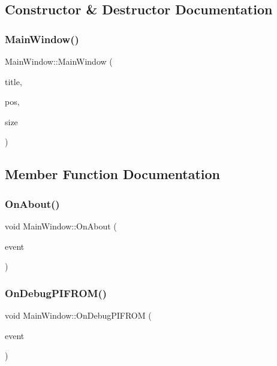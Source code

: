 \subsection{Constructor \& Destructor Documentation}
\mbox{\label{class_main_window_ab5bd7c178471f31f5c7f20fad6446382}} 
\subsubsection{\texorpdfstring{Main\+Window()}{MainWindow()}}
{\footnotesize\ttfamily Main\+Window\+::\+Main\+Window (\begin{DoxyParamCaption}\item[{const wx\+String \&}]{title,  }\item[{const wx\+Point \&}]{pos,  }\item[{const wx\+Size \&}]{size }\end{DoxyParamCaption})}



\subsection{Member Function Documentation}
\mbox{\label{class_main_window_afa16bbfe7c1f9f4ba9192210ca68d996}} 
\subsubsection{\texorpdfstring{On\+About()}{OnAbout()}}
{\footnotesize\ttfamily void Main\+Window\+::\+On\+About (\begin{DoxyParamCaption}\item[{wx\+Command\+Event \&}]{event }\end{DoxyParamCaption})\hspace{0.3cm}{\ttfamily [private]}}

\mbox{\label{class_main_window_ad417cf49adddf2caaab6b42eaca297e3}} 
\subsubsection{\texorpdfstring{On\+Debug\+P\+I\+F\+R\+O\+M()}{OnDebugPIFROM()}}
{\footnotesize\ttfamily void Main\+Window\+::\+On\+Debug\+P\+I\+F\+R\+OM (\begin{DoxyParamCaption}\item[{wx\+Command\+Event \&}]{event }\end{DoxyParamCaption})\hspace{0.3cm}{\ttfamily [private]}}

